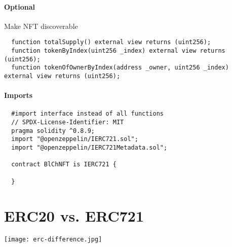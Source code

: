 \paragraph{Optional}
Make NFT discoverable
\begin{lstlisting}
  function totalSupply() external view returns (uint256);
  function tokenByIndex(uint256 _index) external view returns (uint256);
  function tokenOfOwnerByIndex(address _owner, uint256 _index) external view returns (uint256);
\end{lstlisting}

\paragraph{Imports}
\begin{lstlisting}
  #import interface instead of all functions
  // SPDX-License-Identifier: MIT
  pragma solidity ^0.8.9;
  import "@openzeppelin/IERC721.sol";
  import "@openzeppelin/IERC721Metadata.sol";

  contract BlChNFT is IERC721 {
    
  }
\end{lstlisting}

\section {ERC20 vs. ERC721}

\texttt{[image: erc-difference.jpg]}